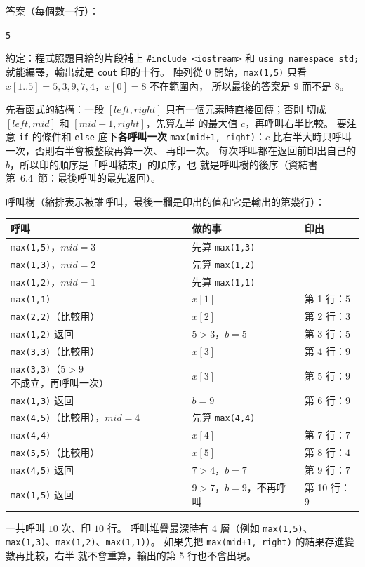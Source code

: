 \begin{pastsoln}
答案（每個數一行）：
\begin{center}
\texttt{5         }
\end{center}

約定：程式照題目給的片段補上 \texttt{\#include <iostream>} 和
\texttt{using namespace std;} 就能編譯，輸出就是 \texttt{cout} 印的十行。 陣列從
$0$ 開始，\texttt{max(1,5)} 只看 $x[1..5] = 5, 3, 9, 7, 4$，$x[0] = 8$ 不在範圍內，
所以最後的答案是 $9$ 而不是 $8$。

先看函式的結構：一段 $[\mathit{left}, \mathit{right}]$ 只有一個元素時直接回傳；否則
切成 $[\mathit{left}, \mathit{mid}]$ 和 $[\mathit{mid} + 1, \mathit{right}]$，先算左半
的最大值 $c$，再呼叫右半比較。 要注意 \texttt{if} 的條件和 \texttt{else} 底下\textbf{各呼叫一次}
\texttt{max(mid+1, right)}：$c$ 比右半大時只呼叫一次，否則右半會被整段再算一次、
再印一次。 每次呼叫都在返回前印出自己的 $b$，所以印的順序是「呼叫結束」的順序，也
就是呼叫樹的後序（資結書第~6.4~節：最後呼叫的最先返回）。

呼叫樹（縮排表示被誰呼叫，最後一欄是印出的值和它是輸出的第幾行）：
\begin{center}
\small
\begin{tabular}{lll}
\toprule
呼叫 & 做的事 & 印出 \\
\midrule
\texttt{max(1,5)}，$\mathit{mid} = 3$ & 先算 \texttt{max(1,3)} & \\
\quad \texttt{max(1,3)}，$\mathit{mid} = 2$ & 先算 \texttt{max(1,2)} & \\
\qquad \texttt{max(1,2)}，$\mathit{mid} = 1$ & 先算 \texttt{max(1,1)} & \\
\qquad\quad \texttt{max(1,1)} & $x[1]$ & 第 1 行：$5$ \\
\qquad\quad \texttt{max(2,2)}（比較用）& $x[2]$ & 第 2 行：$3$ \\
\qquad \texttt{max(1,2)} 返回 & $5 > 3$，$b = 5$ & 第 3 行：$5$ \\
\quad\quad \texttt{max(3,3)}（比較用）& $x[3]$ & 第 4 行：$9$ \\
\quad\quad \texttt{max(3,3)}（$5 > 9$ 不成立，再呼叫一次）& $x[3]$ & 第 5 行：$9$ \\
\quad \texttt{max(1,3)} 返回 & $b = 9$ & 第 6 行：$9$ \\
\quad \texttt{max(4,5)}（比較用），$\mathit{mid} = 4$ & 先算 \texttt{max(4,4)} & \\
\qquad \texttt{max(4,4)} & $x[4]$ & 第 7 行：$7$ \\
\qquad \texttt{max(5,5)}（比較用）& $x[5]$ & 第 8 行：$4$ \\
\quad \texttt{max(4,5)} 返回 & $7 > 4$，$b = 7$ & 第 9 行：$7$ \\
\texttt{max(1,5)} 返回 & $9 > 7$，$b = 9$，不再呼叫 & 第 10 行：$9$ \\
\bottomrule
\end{tabular}
\end{center}

一共呼叫 $10$ 次、印 $10$ 行。 呼叫堆疊最深時有 $4$ 層（例如
\texttt{max(1,5)}、\texttt{max(1,3)}、\texttt{max(1,2)}、\texttt{max(1,1)}）。 如果先把 \texttt{max(mid+1, right)} 的結果存進變數再比較，右半
就不會重算，輸出的第 5 行也不會出現。
\end{pastsoln}
